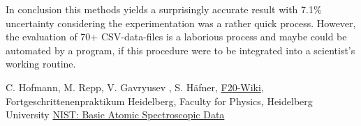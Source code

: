 \documentclass[12pt, a4paper]{article}
\begin{document}
In conclusion this methods yields a surprisingly accurate result with 7.1\% uncertainty considering the experimentation was a rather quick process. However, the evaluation of 70+ CSV-data-files is a laborious process and maybe could be automated by a program, if this procedure were to be integrated into a scientist's working routine.


























\newpage 



\begin{thebibliography}{00}   %
 C. Hofmann, M. Repp, V. Gavryusev , S. H\"afner, \href{https://www.physi.uni-heidelberg.de/Forschung/QD/f20wikinew/index.php/Main_Page}{F20-Wiki}, Fortgeschrittenenpraktikum Heidelberg, Faculty for Physics, Heidelberg University
 \href{https://physics.nist.gov/PhysRefData/Handbook/Tables/rubidiumtable1.htm}{NIST: Basic Atomic Spectroscopic Data}

\end{thebibliography}
\end{document}

